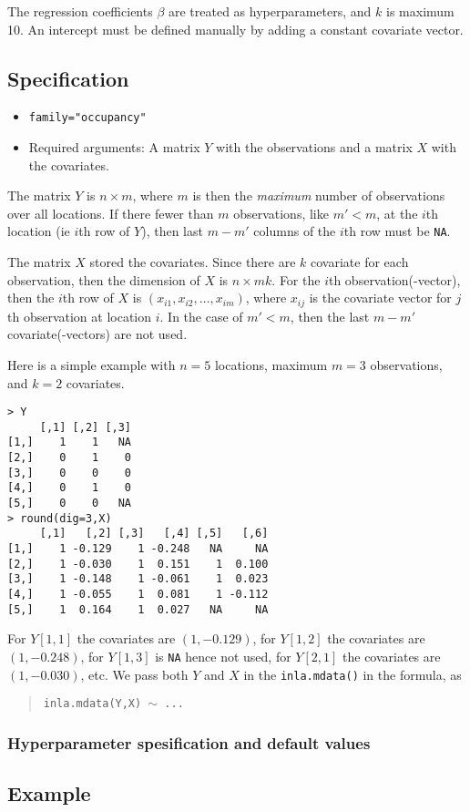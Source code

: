 \documentclass[a4paper,11pt]{article}
\begin{document}
The regression coefficients $\beta$ are treated as hyperparameters,
and $k$ is maximum 10. An intercept must be defined manually by adding
a constant covariate vector.

\subsection*{Specification}

\begin{itemize}
\item \texttt{family="occupancy"}
\item Required arguments: A matrix $Y$ with the observations and a matrix
    $X$ with the covariates.
\end{itemize}
The matrix $Y$ is $n\times m$, where $m$ is then the \emph{maximum}
number of observations over all locations. If there fewer than $m$
observations, like $m' < m$, at the $i$th location (ie $i$th row of
$Y$), then last $m-m'$ columns of the $i$th row must be \texttt{NA}.

The matrix $X$ stored the covariates. Since there are $k$
covariate for each observation, then the dimension of $X$ is
$n \times m k$. For the $i$th observation(-vector), then the
$i$th row of $X$ is $(x_{i1}, x_{i2}, \ldots, x_{im})$, where $x_{ij}$
is the covariate vector for $j$th observation at location $i$. In the
case of $m'<m$, then the last $m-m'$ covariate(-vectors) are not used.

\clearpage
Here is a simple example with $n=5$ locations, maximum $m=3$
observations, and $k=2$ covariates.
\begin{verbatim}
> Y
     [,1] [,2] [,3]
[1,]    1    1   NA
[2,]    0    1    0
[3,]    0    0    0
[4,]    0    1    0
[5,]    0    0   NA
> round(dig=3,X)
     [,1]   [,2] [,3]   [,4] [,5]   [,6]
[1,]    1 -0.129    1 -0.248   NA     NA
[2,]    1 -0.030    1  0.151    1  0.100
[3,]    1 -0.148    1 -0.061    1  0.023
[4,]    1 -0.055    1  0.081    1 -0.112
[5,]    1  0.164    1  0.027   NA     NA
\end{verbatim}
For $Y[1,1]$ the covariates are $(1, -0.129)$, for $Y[1,2]$ the
covariates are $(1, -0.248)$, for $Y[1,3]$ is \texttt{NA} hence not
used, for $Y[2,1]$ the covariates are $(1, -0.030)$, etc. We pass both
$Y$ and $X$ in the \texttt{inla.mdata()} in the formula, as
\begin{quote}
    \texttt{inla.mdata(Y,X) $\sim$ ...}
\end{quote}

\subsubsection*{Hyperparameter spesification and default values}
{\small }

\clearpage
\subsection*{Example}
{\small }
\end{document}
